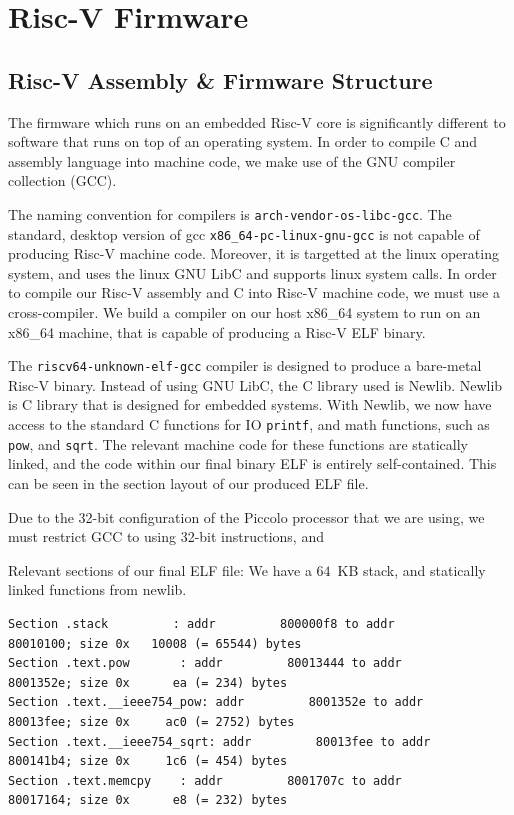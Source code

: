 \documentclass[a4paper,8pt]{report}
\begin{document}

\section{Risc-V Firmware}
\subsection{Risc-V Assembly \& Firmware Structure}
The firmware which runs on an embedded Risc-V core is significantly different to
software that runs on top of an operating system. In order to compile C and
assembly language into machine code, we make use of the GNU compiler collection
(GCC).

The naming convention for compilers is \texttt{arch-vendor-os-libc-gcc}. The
standard, desktop version of gcc \texttt{x86\_64-pc-linux-gnu-gcc} is not
capable of producing Risc-V machine code. Moreover, it is targetted at the linux
operating system, and uses the linux GNU LibC and supports linux system calls.
In order to compile our Risc-V assembly and C into Risc-V machine code, we must
use a cross-compiler. We build a compiler on our host x86\_64 system to run on
an x86\_64 machine, that is capable of producing a Risc-V ELF binary.

The \texttt{riscv64-unknown-elf-gcc} compiler is designed to produce a
bare-metal Risc-V binary. Instead of using GNU LibC, the C library used is
Newlib. Newlib is C library that is designed for embedded systems. With Newlib,
we now have access to the standard C functions for IO \texttt{printf}, and math
functions, such as \texttt{pow}, and \texttt{sqrt}. The relevant machine code
for these functions are statically linked, and the code within our final binary
ELF is entirely self-contained. This can be seen in the section layout of our
produced ELF file.

Due to the 32-bit configuration of the Piccolo processor that we are using, we
must restrict GCC to using 32-bit instructions, and 

Relevant sections of our final ELF file: We have a $64$~KB stack, and statically
linked functions from newlib.  
\tiny
\begin{verbatim}
Section .stack         : addr         800000f8 to addr         80010100; size 0x   10008 (= 65544) bytes
Section .text.pow       : addr         80013444 to addr         8001352e; size 0x      ea (= 234) bytes
Section .text.__ieee754_pow: addr         8001352e to addr         80013fee; size 0x     ac0 (= 2752) bytes
Section .text.__ieee754_sqrt: addr         80013fee to addr         800141b4; size 0x     1c6 (= 454) bytes
Section .text.memcpy    : addr         8001707c to addr         80017164; size 0x      e8 (= 232) bytes
\end{verbatim}
\normalsize
\end{document}
